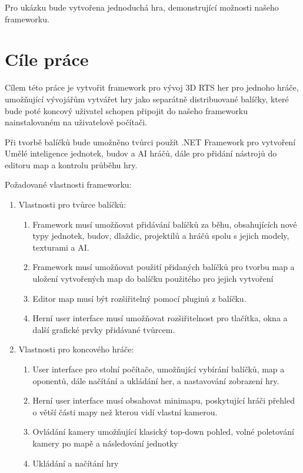Pro ukázku bude vytvořena jednoduchá hra, demonstrující možnosti našeho frameworku. 

\section{Cíle práce}
Cílem této práce je vytvořit framework pro vývoj 3D RTS her pro jednoho hráče, umožňující vývojářům vytvářet hry jako separátně 
distribuované balíčky, které bude poté koncový uživatel schopen připojit do našeho frameworku nainstalovaném na uživatelově počítači.

Při tvorbě balíčků bude umožněno tvůrci použít .NET Framework pro vytvoření Umělé inteligence jednotek, budov a AI hráčů, dále pro přidání nástrojů do editoru map a  kontrolu průběhu hry.

Požadované vlastnosti frameworku:
\begin{enumerate}
	\item Vlastnosti pro tvůrce balíčků:
		\begin{enumerate}
			\item Framework musí umožňovat přidávání balíčků za běhu, obsahujících nové typy jednotek, budov,  dlaždic, projektilů a hráčů spolu s jejich modely, texturami a AI.
			\item Framework musí umožňovat použití přidaných balíčků pro tvorbu map a uložení vytvořených map do balíčku použitého pro jejich vytvoření
			\item Editor map musí být rozšiřitelný pomocí pluginů z balíčku.
			\item Herní user interface musí umožňovat rozšiřitelnost pro tlačítka, okna a další grafické prvky přidávané tvůrcem.
		\end{enumerate}

	\item Vlastnosti pro koncového hráče:
		\begin{enumerate}
			\item User interface pro stolní počítače, umožňující vybírání balíčků, map a oponentů, dále načítání a ukládání her, a nastavování zobrazení hry.
			\item Herní user interface musí obsahovat minimapu, poskytující hráči přehled o větší části mapy než kterou vidí vlastní kamerou.
			\item Ovládání kamery umožňující klasický top-down pohled, volné poletování kamery po mapě a následování jednotky
			\item Ukládání a načítání hry
		\end{enumerate}
\end{enumerate}
